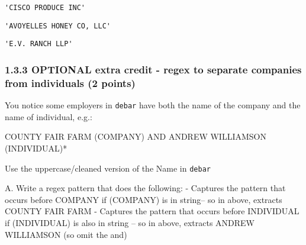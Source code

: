 \documentclass[11pt]{article}
\makeatletter
\newcommand{\boxspacing}{\kern\kvtcb@left@rule\kern\kvtcb@boxsep}
\newcommand{\prompt}[4]{
        {\ttfamily\llap{{\color{#2}[#3]:\hspace{3pt}#4}}\vspace{-\baselineskip}}
    }
\makeatother
\begin{document}
            \begin{tcolorbox}[breakable, size=fbox, boxrule=.5pt, pad at break*=1mm, opacityfill=0]
\prompt{Out}{outcolor}{170}{\boxspacing}
\begin{Verbatim}[commandchars=\\\{\}]
'CISCO PRODUCE INC'
\end{Verbatim}
\end{tcolorbox}
        
            \begin{tcolorbox}[breakable, size=fbox, boxrule=.5pt, pad at break*=1mm, opacityfill=0]
\prompt{Out}{outcolor}{170}{\boxspacing}
\begin{Verbatim}[commandchars=\\\{\}]
'AVOYELLES HONEY CO, LLC'
\end{Verbatim}
\end{tcolorbox}
        
            \begin{tcolorbox}[breakable, size=fbox, boxrule=.5pt, pad at break*=1mm, opacityfill=0]
\prompt{Out}{outcolor}{170}{\boxspacing}
\begin{Verbatim}[commandchars=\\\{\}]
'E.V. RANCH LLP'
\end{Verbatim}
\end{tcolorbox}
        
    \hypertarget{optional-extra-credit---regex-to-separate-companies-from-individuals-2-points}{%
\subsubsection{1.3.3 OPTIONAL extra credit - regex to separate companies
from individuals (2
points)}\label{optional-extra-credit---regex-to-separate-companies-from-individuals-2-points}}

You notice some employers in \texttt{debar} have both the name of the
company and the name of individual, e.g.:

COUNTY FAIR FARM (COMPANY) AND ANDREW WILLIAMSON (INDIVIDUAL)*

Use the uppercase/cleaned version of the Name in \texttt{debar}

A. Write a regex pattern that does the following: - Captures the pattern
that occurs before COMPANY if (COMPANY) is in string-- so in above,
extracts COUNTY FAIR FARM - Captures the pattern that occurs before
INDIVIDUAL if (INDIVIDUAL) is also in string -- so in above, extracts
ANDREW WILLIAMSON (so omit the and)
\end{document}
